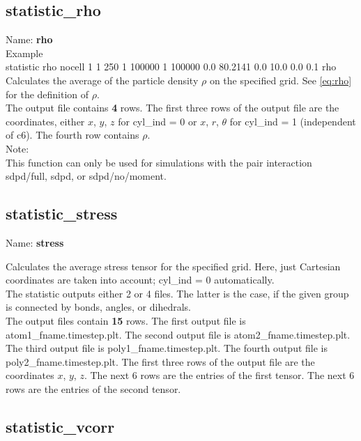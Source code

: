 \documentclass[a4paper,10pt]{scrreprt}
\begin{document}
\subsection{statistic\_rho}

Name: {\bfseries rho}
\\[2ex]
Example\\[0.5ex]
statistic       rho nocell 1 1 250 1 100000 1 100000 0.0 80.2141 0.0 10.0 0.0 0.1 rho
\\[2ex]
Calculates the average of the particle density $\rho$ on the specified grid.
See \cref{eq:rho} for the definition of $\rho$.
\\[2ex]
The output file contains {\bfseries 4} rows.
The first three rows of the output file are the coordinates, either $x$, $y$, $z$ for cyl\_ind = 0 or $x$, $r$, $\theta$ for cyl\_ind = 1 (independent of c6).
The fourth row contains $\rho$.
\\[2ex]
Note:\\
This function can only be used for simulations with the pair interaction sdpd/full, sdpd, or sdpd/no/moment.


\subsection{statistic\_stress}

Name: {\bfseries stress}

Calculates the average stress tensor for the specified grid.
Here, just Cartesian coordinates are taken into account; cyl\_ind = 0 automatically.
\\[2ex]
The statistic outputs either 2 or 4 files.
The latter is the case, if the given group is connected by bonds, angles, or dihedrals.\\
The output files contain {\bfseries 15} rows.
The first output file is \glqq atom1\_fname.timestep.plt\grqq.
The second output file is \glqq atom2\_fname.timestep.plt\grqq.
The third output file is \glqq poly1\_fname.timestep.plt\grqq.
The fourth output file is \glqq poly2\_fname.timestep.plt\grqq.
The first three rows of the output file are the coordinates $x$, $y$, $z$.
The next 6 rows are the entries of the first tensor.
The next 6 rows are the entries of the second tensor.


\subsection{statistic\_vcorr}
\end{document}
